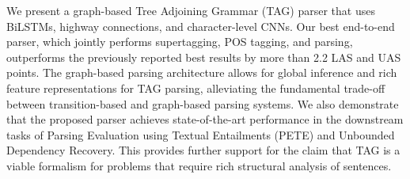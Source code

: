 We present a graph-based Tree Adjoining Grammar (TAG) parser that uses BiLSTMs, highway connections, and character-level CNNs. Our best end-to-end parser, which jointly performs supertagging, POS tagging, and parsing, outperforms the previously reported best results by more than 2.2 LAS and UAS points. The graph-based parsing architecture allows for global inference and rich feature representations for TAG parsing, alleviating the fundamental trade-off between transition-based and graph-based parsing systems. We also demonstrate that the proposed parser achieves state-of-the-art performance in the downstream tasks of Parsing Evaluation using Textual Entailments (PETE) and Unbounded Dependency Recovery. This provides further support for the claim that TAG is a viable formalism for problems that require rich structural analysis of sentences.
